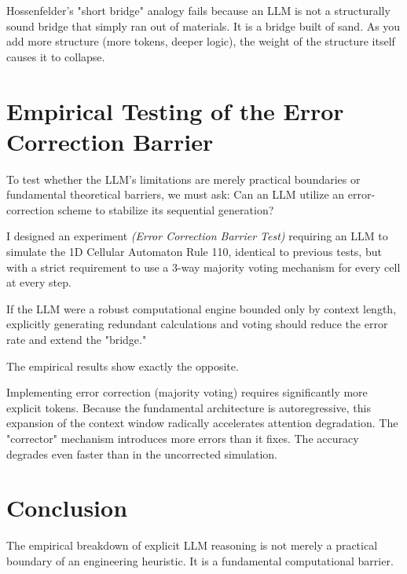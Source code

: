 \documentclass[12pt,a4paper]{article}
\begin{document}
Hossenfelder's "short bridge" analogy fails because an LLM is not a structurally sound bridge that simply ran out of materials. It is a bridge built of sand. As you add more structure (more tokens, deeper logic), the weight of the structure itself causes it to collapse. 

\section{Empirical Testing of the Error Correction Barrier}

To test whether the LLM's limitations are merely practical boundaries or fundamental theoretical barriers, we must ask: Can an LLM utilize an error-correction scheme to stabilize its sequential generation?

I designed an experiment \emph{(Error Correction Barrier Test)} requiring an LLM to simulate the 1D Cellular Automaton Rule 110, identical to previous tests, but with a strict requirement to use a 3-way majority voting mechanism for every cell at every step.

If the LLM were a robust computational engine bounded only by context length, explicitly generating redundant calculations and voting should reduce the error rate and extend the "bridge."

The empirical results show exactly the opposite.

Implementing error correction (majority voting) requires significantly more explicit tokens. Because the fundamental architecture is autoregressive, this expansion of the context window radically accelerates attention degradation. The "corrector" mechanism introduces more errors than it fixes. The accuracy degrades even faster than in the uncorrected simulation. 

\section{Conclusion}

The empirical breakdown of explicit LLM reasoning is not merely a practical boundary of an engineering heuristic. It is a fundamental computational barrier.
\end{document}
